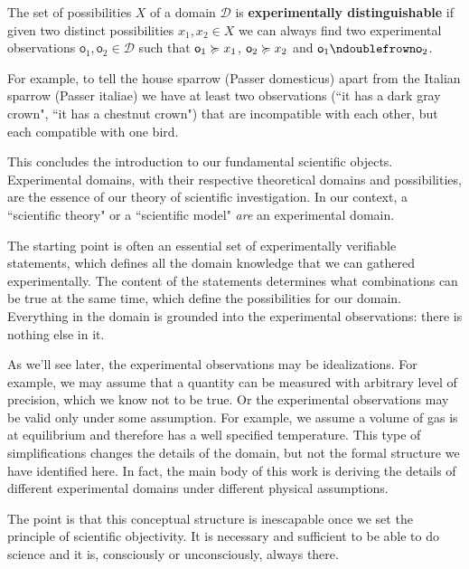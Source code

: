 \documentclass[11pt,letterpaper,fleqn]{memoir} %
\begin{document}
\begin{mathSection}
\begin{defn}
	The set of possibilities $X$ of a domain $\mathcal{D}$ is \textbf{experimentally distinguishable} if given two distinct possibilities $x_1, x_2 \in X$ we can always find two experimental observations $\textsf{o}_1, \textsf{o}_2 \in \mathcal{D}$ such that $\textsf{o}_1 \succcurlyeq x_1$, $\textsf{o}_2 \succcurlyeq x_2$ and $\textsf{o}_1 \ncomp \textsf{o}_2$.
\end{defn}
\end{mathSection}

For example, to tell the house sparrow (Passer domesticus) apart from the Italian sparrow (Passer italiae) we have at least two observations (``it has a dark gray crown", ``it has a chestnut crown") that are incompatible with each other, but each compatible with one bird.

This concludes the introduction to our fundamental scientific objects. Experimental domains, with their respective theoretical domains and possibilities, are the essence of our theory of scientific investigation. In our context, a ``scientific theory" or a ``scientific model" \emph{are} an experimental domain.


The starting point is often an essential set of experimentally verifiable statements, which defines all the domain knowledge that we can gathered experimentally. The content of the statements determines what combinations can be true at the same time, which define the possibilities for our domain. Everything in the domain is grounded into the experimental observations: there is nothing else in it.

As we'll see later, the experimental observations may be idealizations. For example, we may assume that a quantity can be measured with arbitrary level of precision, which we know not to be true. Or the experimental observations may be valid only under some assumption. For example, we assume a volume of gas is at equilibrium and therefore has a well specified temperature. This type of simplifications changes the details of the domain, but not the formal structure we have identified here. In fact, the main body of this work is deriving the details of different experimental domains under different physical assumptions.

The point is that this conceptual structure is inescapable once we set the principle of scientific objectivity. It is necessary and sufficient to be able to do science and it is, consciously or unconsciously, always there.
\end{document}
